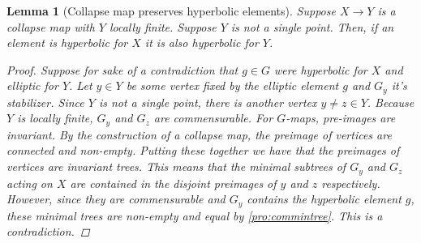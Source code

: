 \documentclass[12pt,parskip=full]{report}
\theoremstyle{plain}
\newtheorem{lem}[thm]{Lemma}
\theoremstyle{definition}
\begin{document}
\begin{lem}
    [Collapse map preserves hyperbolic elements]
    \label{lem:preservehyperbolicity}
    Suppose \(X \to Y\) is a collapse map with \(Y\) locally finite. Suppose \(Y\) is not a single point. Then, if an element is hyperbolic for \(X\) it is also hyperbolic for \(Y\).
    \begin{proof}
        Suppose for sake of a contradiction that \(g\in G\) were hyperbolic for \(X\) and elliptic for \(Y\). Let \(y \in Y\) be some vertex fixed by the elliptic element \(g\) and \(G_y\) it's stabilizer. Since \(Y\) is not a single point, there is another vertex \(y\neq z \in Y\). Because \(Y\) is locally finite, \(G_y\) and \(G_z\) are commensurable. For \(G\)-maps, pre-images are invariant. By the construction of a collapse map, the preimage of vertices are connected and non-empty. Putting these together we have that the preimages of vertices are invariant trees. This means that the minimal subtrees of \(G_y\) and \(G_z\) acting on \(X\) are contained in the disjoint preimages of \(y\) and \(z\) respectively. However, since they are commensurable and \(G_y\) contains the hyperbolic element \(g\), these minimal trees are non-empty and equal by \ref{pro:commintree}. This is a contradiction.
    \end{proof}
        
        
\end{lem}
\end{document}
